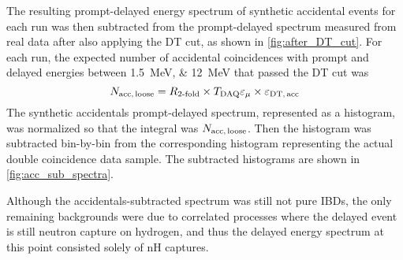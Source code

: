 The resulting prompt-delayed energy spectrum of synthetic accidental events
for each run was then subtracted
from the prompt-delayed spectrum measured from real data
after also applying the DT cut, as shown in \cref{fig:after_DT_cut}.
For each run, the expected number of accidental coincidences
with prompt and delayed energies between \SIlist{1.5;12}{\MeV}
that passed the DT cut was
\begin{equation}
    N_{\text{acc,\,loose}} = R_{\text{\ensuremath{2}-fold}}
        \times T_\text{DAQ}\varepsilon_\mu
        \times \varepsilon_{\text{DT,\,acc}}
    \label{eq:nacc_loose}
\end{equation}
The synthetic accidentals prompt-delayed spectrum, represented as a histogram,
was normalized so that the integral was $N_{\text{acc,\,loose}}$.
Then the histogram was subtracted bin-by-bin from the corresponding histogram
representing the actual double coincidence data sample.
The subtracted histograms are shown in \cref{fig:acc_sub_spectra}.


Although the accidentals-subtracted spectrum was still not pure IBDs,
the only remaining backgrounds were due to correlated processes
where the delayed event is still
neutron capture on hydrogen, and thus
the delayed energy spectrum at this point
consisted solely of nH captures.

